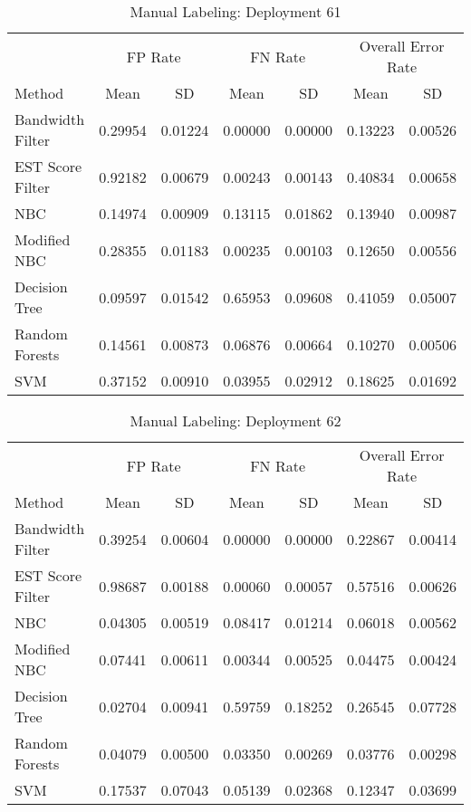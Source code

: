 \documentclass[twoside]{article}
\begin{document}
\begin{table}[H]
\caption{Manual Labeling: Deployment 61}
\centering
\begin{tabular}{lcccccc}
\toprule
\multicolumn{1}{c}{ } 
&\multicolumn{2}{c}{FP Rate } 
&\multicolumn{2}{c}{FN Rate } 
&\multicolumn{2}{c}{Overall Error Rate } \\
\cmidrule(r){2-3}
\cmidrule(r){4-5}
\cmidrule(r){6-7}
Method& Mean & SD & Mean & SD & Mean & SD \\
\midrule
Bandwidth Filter & 0.29954 & 0.01224 & 0.00000 & 0.00000 & 0.13223 & 0.00526 \\
EST Score Filter & 0.92182 & 0.00679 & 0.00243 & 0.00143 & 0.40834 & 0.00658 \\
NBC & 0.14974 & 0.00909 & 0.13115 & 0.01862 & 0.13940 & 0.00987 \\
Modified NBC & 0.28355 & 0.01183 & 0.00235 & 0.00103 & 0.12650 & 0.00556 \\
Decision Tree & 0.09597 & 0.01542 & 0.65953 & 0.09608 & 0.41059 & 0.05007 \\
Random Forests & 0.14561 & 0.00873 & 0.06876 & 0.00664 & 0.10270 & 0.00506 \\
SVM & 0.37152 & 0.00910 & 0.03955 & 0.02912 & 0.18625 & 0.01692 \\
\bottomrule
\end{tabular}
\end{table}

\begin{table}[H]
\caption{Manual Labeling: Deployment 62}
\centering
\begin{tabular}{lcccccc}
\toprule
\multicolumn{1}{c}{ } 
&\multicolumn{2}{c}{FP Rate } 
&\multicolumn{2}{c}{FN Rate } 
&\multicolumn{2}{c}{Overall Error Rate } \\
\cmidrule(r){2-3}
\cmidrule(r){4-5}
\cmidrule(r){6-7}
Method& Mean & SD & Mean & SD & Mean & SD \\
\midrule
Bandwidth Filter & 0.39254 & 0.00604 & 0.00000 & 0.00000 & 0.22867 & 0.00414 \\
EST Score Filter & 0.98687 & 0.00188 & 0.00060 & 0.00057 & 0.57516 & 0.00626 \\
NBC & 0.04305 & 0.00519 & 0.08417 & 0.01214 & 0.06018 & 0.00562 \\
Modified NBC & 0.07441 & 0.00611 & 0.00344 & 0.00525 & 0.04475 & 0.00424 \\
Decision Tree & 0.02704 & 0.00941 & 0.59759 & 0.18252 & 0.26545 & 0.07728 \\
Random Forests & 0.04079 & 0.00500 & 0.03350 & 0.00269 & 0.03776 & 0.00298 \\
SVM & 0.17537 & 0.07043 & 0.05139 & 0.02368 & 0.12347 & 0.03699 \\
\bottomrule
\end{tabular}
\end{table}
\end{document}

